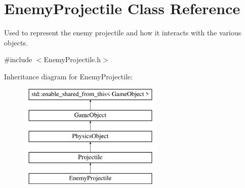 \hypertarget{class_enemy_projectile}{}\section{Enemy\+Projectile Class Reference}
\label{class_enemy_projectile}


Used to represent the enemy projectile and how it interacts with the various objects.  




{\ttfamily \#include $<$Enemy\+Projectile.\+h$>$}

Inheritance diagram for Enemy\+Projectile\+:\begin{figure}[H]
\begin{center}
\leavevmode
\includegraphics[height=5.000000cm]{da/db2/class_enemy_projectile}
\end{center}
\end{figure}
